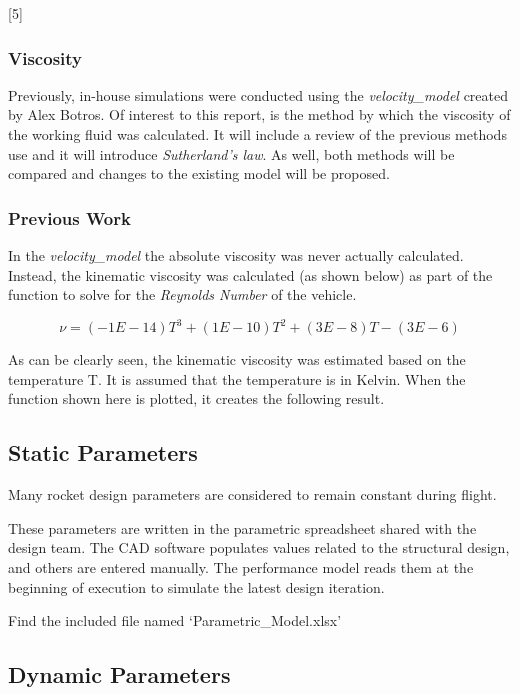 \documentclass[]{article}
\begin{document}
{[}5{]}

\subsubsection{Viscosity}\label{viscosity}

Previously, in-house simulations were conducted using the
\emph{velocity\_model} created by Alex Botros. Of interest to this
report, is the method by which the viscosity of the working fluid was
calculated. It will include a review of the previous methods use and it
will introduce \emph{Sutherland's law}. As well, both methods will be
compared and changes to the existing model will be proposed.

\subsubsection{Previous Work}\label{previous-work}

In the \emph{velocity\_model} the absolute viscosity was never actually
calculated. Instead, the kinematic viscosity was calculated (as shown
below) as part of the function to solve for the \emph{Reynolds Number}
of the vehicle.

\begin{equation}
\label{kinematic_viscosity_f_T}
\nu = (-1 E -14) T^3 + (1 E -10) T^2 + (3 E -8) T - (3 E -6)
\end{equation}

As can be clearly seen, the kinematic viscosity was estimated based on
the temperature T. It is assumed that the temperature is in Kelvin. When
the function shown here is plotted, it creates the following result.

\subsection{Static Parameters}\label{static-parameters}

Many rocket design parameters are considered to remain constant during
flight.

These parameters are written in the parametric spreadsheet shared with
the design team. The CAD software populates values related to the
structural design, and others are entered manually. The performance
model reads them at the beginning of execution to simulate the latest
design iteration.

Find the included file named `Parametric\_Model.xlsx'

\subsection{Dynamic Parameters}\label{dynamic-parameters}
\end{document}
